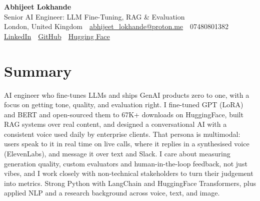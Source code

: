 \documentclass[10pt,a4paper]{article}
\newcommand{\sep}{\,\textcolor{accent!60}{\textbar}\,}
\begin{document}
\begin{center}
  {\fontsize{24}{26}\selectfont\bfseries Abhijeet Lokhande}\\[3pt]
  {\color{accent}\large Senior AI Engineer: LLM Fine-Tuning, RAG \& Evaluation}\\[5pt]
  {\small
    London, United Kingdom \sep
    \href{mailto:abhijeet_lokhande@proton.me}{abhijeet\_lokhande@proton.me} \sep
    07480801382 \\[2pt]
    \href{https://www.linkedin.com/in/ablds/}{LinkedIn} \sep
    \href{https://github.com/abhijeetscode}{GitHub} \sep
    \href{https://huggingface.co/ab-ai}{Hugging Face}
  }
\end{center}
\vspace{2pt}

\section{Summary}
AI engineer who fine-tunes LLMs and ships GenAI products zero to one, with a focus on getting tone, quality, and evaluation right. I fine-tuned GPT (LoRA) and BERT and open-sourced them to 67K+ downloads on HuggingFace, built RAG systems over real content, and designed a conversational AI with a consistent voice used daily by enterprise clients. That persona is multimodal: users speak to it in real time on live calls, where it replies in a synthesised voice (ElevenLabs), and message it over text and Slack. I care about measuring generation quality, custom evaluators and human-in-the-loop feedback, not just vibes, and I work closely with non-technical stakeholders to turn their judgement into metrics. Strong Python with LangChain and HuggingFace Transformers, plus applied NLP and a research background across voice, text, and image.

\end{document}
